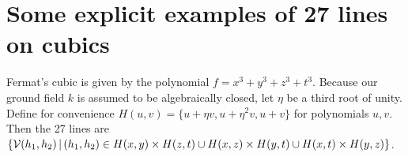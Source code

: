 \section{Some explicit examples of 27 lines on cubics}

\begin{example}
Fermat's cubic is given by the polynomial $f = x^3 + y^3 + z^3 + t^3$.
Because our ground field $k$ is assumed to be algebraically closed, let $\eta$ be a third root of unity.
Define for convenience $H(u,v) = \{ u+\eta v, u+\eta^2v, u+v \}$ for polynomials $u,v$.
Then the 27 lines are
$\left\lbrace \operatorname{\mathcal V}(h_1,h_2) \,|\,  (h_1,h_2) \in H(x,y)\times H(z,t) \cup H(x,z)\times H(y,t) \cup H(x,t)\times H(y,z)\right\rbrace$.
\end{example}

\begin{example}
\end{example}
